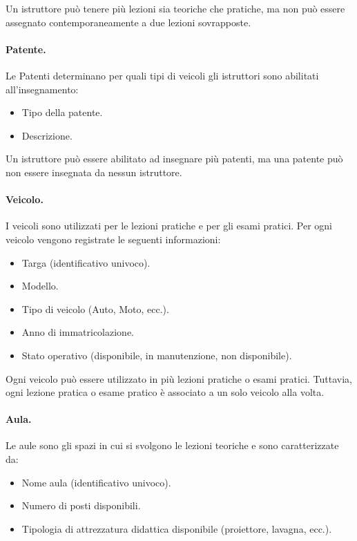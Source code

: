 \documentclass[10pt,twoside]{article}
\begin{document}
{    Un istruttore può tenere più lezioni sia teoriche che pratiche, ma non può essere assegnato contemporaneamente a due lezioni sovrapposte.
    

    \paragraph{Patente.}
    Le Patenti determinano per quali tipi di veicoli gli istruttori sono abilitati all'insegnamento:
    
    \begin{itemize}
        \item Tipo della patente. 
        \item Descrizione.
    \end{itemize}

    Un istruttore può essere abilitato ad insegnare più patenti, ma una patente può non essere insegnata da nessun istruttore.

    \paragraph{Veicolo.}
    I veicoli sono utilizzati per le lezioni pratiche e per gli esami pratici. Per ogni veicolo vengono registrate le seguenti informazioni:
    
    \begin{itemize}
        \item Targa (identificativo univoco).
        \item Modello.
        \item Tipo di veicolo (Auto, Moto, ecc.).
        \item Anno di immatricolazione.
        \item Stato operativo (disponibile, in manutenzione, non disponibile).
    \end{itemize}

    Ogni veicolo può essere utilizzato in più lezioni pratiche o esami pratici. Tuttavia, ogni lezione pratica o esame pratico è associato a un solo veicolo alla volta.
    

    \paragraph{Aula.}
    Le aule sono gli spazi in cui si svolgono le lezioni teoriche e sono caratterizzate da:

    \begin{itemize}
        \item Nome aula (identificativo univoco).
        \item Numero di posti disponibili.
        \item Tipologia di attrezzatura didattica disponibile (proiettore, lavagna, ecc.).
    \end{itemize}

}
\end{document}

